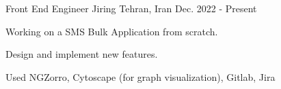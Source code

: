 \begin{cventries}
\cventry
{Front End Engineer} %
{Jiring} %
{Tehran, Iran} %
{Dec. 2022 - Present} %
{
	\begin{cvitems} %
		\item {Working on a SMS Bulk Application from scratch.}
		\item {Design and implement new features.}
		\item {Used NGZorro, Cytoscape (for graph visualization), Gitlab, Jira}
	\end{cvitems}
}

\end{cventries}
